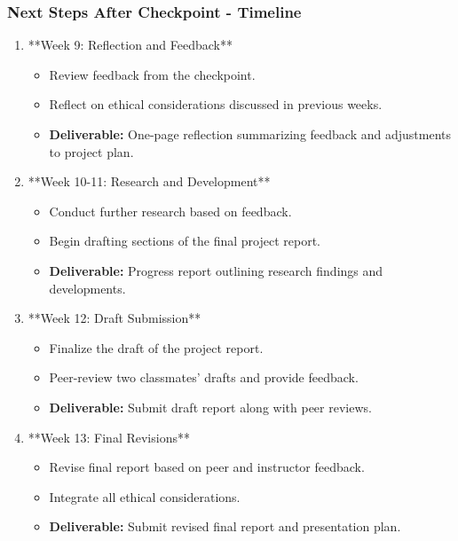 \documentclass[aspectratio=169]{beamer}
\begin{document}
\begin{frame}[fragile]
    \frametitle{Next Steps After Checkpoint - Timeline}
    \begin{enumerate}
        \item **Week 9: Reflection and Feedback**
            \begin{itemize}
                \item Review feedback from the checkpoint.
                \item Reflect on ethical considerations discussed in previous weeks.
                \item \textbf{Deliverable:} One-page reflection summarizing feedback and adjustments to project plan.
            \end{itemize}
        
        \item **Week 10-11: Research and Development**
            \begin{itemize}
                \item Conduct further research based on feedback.
                \item Begin drafting sections of the final project report.
                \item \textbf{Deliverable:} Progress report outlining research findings and developments.
            \end{itemize}
        
        \item **Week 12: Draft Submission**
            \begin{itemize}
                \item Finalize the draft of the project report.
                \item Peer-review two classmates' drafts and provide feedback.
                \item \textbf{Deliverable:} Submit draft report along with peer reviews.
            \end{itemize}
        
        \item **Week 13: Final Revisions**
            \begin{itemize}
                \item Revise final report based on peer and instructor feedback.
                \item Integrate all ethical considerations.
                \item \textbf{Deliverable:} Submit revised final report and presentation plan.
            \end{itemize}
        

\end{enumerate}
\end{frame}
\end{document}
